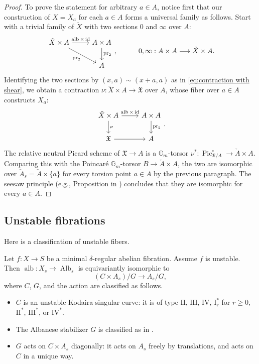 \documentclass[reqno, letterpaper]{amsart}
\numberwithin{equation}{subsection}
\let\to\longrightarrow
\newcommand{\GG}{\mathbb{G}}
\DeclareMathOperator{\id}{id}
\DeclareMathOperator{\Pic}{Pic}
\DeclareMathOperator{\pr}{pr}
\DeclareMathOperator{\Alb}{Alb}
\DeclareMathOperator{\alb}{alb}
\begin{document}
\begin{proof}
				To prove the statement for arbitrary $a \in A$, notice first that our construction of $X = X_a$ for each $a \in A$ forms a universal family as follows. Start with a trivial family of $\tilde X$ with two sections $0$ and $\infty$ over $A$:
				\[\begin{tikzcd}[column sep=normal]
					\tilde X \times A \arrow[r, "\alb \times \id"] \arrow[rd, "\pr_2"'] & A \times A \arrow[d, "\pr_2"] \\
					& A
				\end{tikzcd}, \qquad\quad 0, \infty : A \times A \to \tilde X \times A .\]
				Identifying the two sections by $(x,a) \sim (x+a,a)$ as in \eqref{eq:contraction with shear}, we obtain a contraction $\nu : \tilde X \times A \to \mathfrak X$ over $A$, whose fiber over $a \in A$ constructs $X_a$:
				\[\begin{tikzcd}[column sep=normal]
					\tilde X \times A \arrow[r, "\alb \times \id"] \arrow[d, "\nu"] & A \times A \arrow[d, "\pr_2"] \\
					\mathfrak X \arrow[r] & A
				\end{tikzcd}.\]
				The relative neutral Picard scheme of $\mathfrak X \to A$ is a $\GG_m$-torsor $\nu^* : \Pic_{\mathfrak X/A}^\circ \to \check A \times A$. Comparing this with the Poincar\'e $\GG_m$-torsor $B \to \check A \times A$, the two are isomorphic over $\check A_s = \check A \times \{ a \}$ for every torsion point $a \in A$ by the previous paragraph. The seesaw principle (e.g., Proposition in \cite[\S 10]{mum:abelian_variety}) concludes that they are isomorphic for every $a \in A$.
			\end{proof}
			
			
			
	\subsection{Unstable fibrations} \label{sec:classification of unstable fibers}
		Here is a classification of unstable fibers.
		
		\begin{theorem} \label{thm:classification of unstable fibers}
			Let $f : X \to S$ be a minimal $\delta$-regular abelian fibration. Assume $f$ is unstable. Then $\alb : X_s \to \Alb_s$ is equivariantly isomorphic to
			\[ (C \times A_s) / G \to A_s / G ,\]
			where $C$, $G$, and the action are classified as follows.
			\begin{itemize}
				\item $C$ is an unstable Kodaira singular curve: it is of type $\mathrm {II}$, $\mathrm{III}$, $\mathrm{IV}$, $\mathrm{I}_r^*$ for $r \ge 0$, $\mathrm{II}^*$, $\mathrm{III}^*$, or $\mathrm{IV}^*$.
				
				\item The Albanese stabilizer $G$ is classified as in .
				
				\item $G$ acts on $C \times A_s$ diagonally: it acts on $A_s$ freely by translations, and acts on $C$ in a unique way.
			\end{itemize}
		\end{theorem}
		
\end{document}
